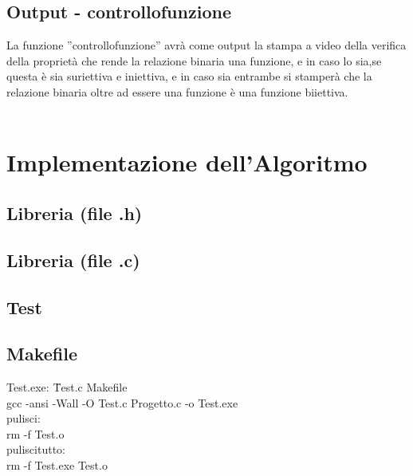 \documentclass[11pt, a4paper, titlepage, block]{article}
\begin{document}
	\subsection{Output - controllo\textunderscore funzione}
	La funzione ”controllo\textunderscore funzione” avr\`a come output la stampa a video della verifica della propriet\`a che rende la relazione binaria una funzione, e in caso lo sia,se questa \`e sia suriettiva e iniettiva, e in caso sia entrambe si stamper\`a che la relazione binaria oltre ad essere una funzione \`e una funzione biiettiva.\\
	\\
	\newpage
	\section{Implementazione dell'Algoritmo}
	\subsection{Libreria (file .h) }
	\lstset{numbers=left, tabsize=2,breaklines=true, language=C}
	 
	\newpage
	\subsection{Libreria (file .c) }
	\lstset{numbers=left, tabsize=2,breaklines=true, language=C}
	 
	\newpage	
	\subsection{Test}
	\lstset{numbers=left, tabsize=2,breaklines=true, language=C}
	
	\newpage
\subsection{Makefile}
\begin{tabbing}
	Test.exe: \=Test.c Makefile\\
	\>gcc -ansi -Wall -O Test.c Progetto.c -o Test.exe\\
	pulisci:\\
	\>rm -f Test.o\\
	pulisci\textunderscore tutto:\\
	\>rm -f Test.exe Test.o\\
\end{tabbing}
	
	
	
	
	
	
	
\end{document}
